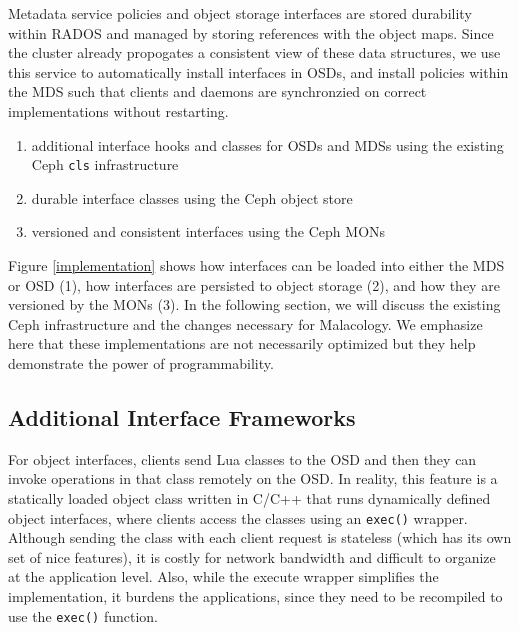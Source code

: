 \documentclass[10pt,twocolumn]{article}
\begin{document}
Metadata service policies and object storage interfaces are stored durability
within RADOS and managed by storing references with the object maps. Since
the cluster already propogates a consistent view of these data structures,
we use this service to automatically install interfaces in OSDs, and install
policies within the MDS such that clients and daemons are synchronzied on
correct implementations without restarting.

\iffalse
\begin{enumerate}
\def\labelenumi{\arabic{enumi}.}
\item
  additional interface hooks and classes for OSDs and MDSs using the
  existing Ceph \texttt{cls} infrastructure
\item
  durable interface classes using the Ceph object store
\item
  versioned and consistent interfaces using the Ceph MONs
\end{enumerate}

Figure \ref{implementation} shows how interfaces can be loaded into
either the MDS or OSD (1), how interfaces are persisted to object
storage (2), and how they are versioned by the MONs (3). In the
following section, we will discuss the existing Ceph infrastructure and
the changes necessary for Malacology. We emphasize here that these
implementations are not necessarily optimized but they help demonstrate
the power of programmability.

\subsection{Additional Interface
Frameworks}\label{additional-interface-frameworks}

For object interfaces, clients send Lua classes to the OSD and then they
can invoke operations in that class remotely on the OSD. In reality,
this feature is a statically loaded object class written in C/C++ that
runs dynamically defined object interfaces, where clients access the
classes using an \texttt{exec()} wrapper. Although sending the class
with each client request is stateless (which has its own set of nice
features), it is costly for network bandwidth and difficult to organize
at the application level. Also, while the execute wrapper simplifies the
implementation, it burdens the applications, since they need to be
recompiled to use the \texttt{exec()} function.
\end{document}
